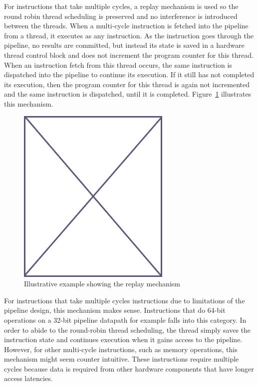 For instructions that take multiple cycles, a replay mechanism is used so the round robin thread scheduling is preserved and no interference is introduced between the threads.
When a multi-cycle instruction is fetched into the pipeline from a thread, it executes as any instruction.
As the instruction goes through the pipeline, no results are committed, but instead its state is saved in a hardware thread control block and does not increment the program counter for this thread. 
When an instruction fetch from this thread occurs, the same instruction is dispatched into the pipeline to continue its execution. 
If it still has not completed its execution, then the program counter for this thread is again not incremented and the same instruction is dispatched, until it is completed. 
Figure~\ref{fig:replay_mechanism_example} illustrates this mechanism.    
\begin{figure}
\begin{center}
\includegraphics[scale=.4]{figs/placeholder}
\end{center}
\caption{Illustrative example showing the replay mechanism}
\label{fig:replay_mechanism_example}
\end{figure}
For instructions that take multiple cycles instructions due to limitations of the pipeline design, this mechanism makes sense.
Instructions that do 64-bit operations on a 32-bit pipeline datapath for example falls into this category. 
In order to abide to the round-robin thread scheduling, the thread simply saves the instruction state and continues execution when it gains access to the pipeline. 
However, for other multi-cycle instructions, such as memory operations, this mechanism might seem counter intuitive. 
These instructions require multiple cycles because data is required from other hardware components that have longer access latencies.
